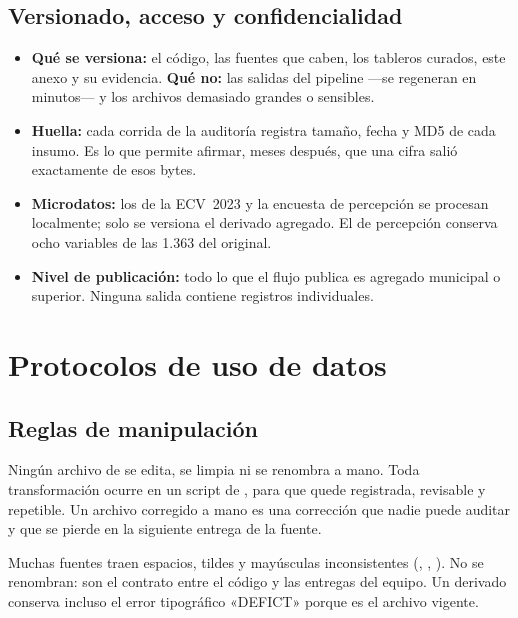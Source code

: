 \documentclass[11pt,a4paper]{article}
\begin{document}
\subsection{Versionado, acceso y confidencialidad}

\begin{itemize}[leftmargin=*, itemsep=2pt]
  \item \textbf{Qué se versiona:} el código, las fuentes que caben, los
    tableros curados, este anexo y su evidencia. \textbf{Qué no:} las salidas
    del pipeline —se regeneran en minutos— y los archivos demasiado grandes o
    sensibles.
  \item \textbf{Huella:} cada corrida de la auditoría registra tamaño, fecha y
    MD5 de cada insumo. Es lo que permite afirmar, meses después, que una cifra
    salió exactamente de esos bytes.
  \item \textbf{Microdatos:} los de la ECV~2023 y la encuesta de percepción se
    procesan localmente; solo se versiona el derivado agregado. El de percepción
    conserva ocho variables de las 1.363 del original.
  \item \textbf{Nivel de publicación:} todo lo que el flujo publica es agregado
    municipal o superior. Ninguna salida contiene registros individuales.
\end{itemize}

\section{Protocolos de uso de datos}

\subsection{Reglas de manipulación}

\begin{regla}[title={Regla 2 — las fuentes no se tocan}]
Ningún archivo de  se edita, se limpia ni se renombra a mano.
Toda transformación ocurre en un script de ,
para que quede registrada, revisable y repetible. Un archivo corregido a mano
es una corrección que nadie puede auditar y que se pierde en la siguiente
entrega de la fuente.
\end{regla}

\begin{regla}[title={Regla 3 — los nombres de archivo son un contrato}]
Muchas fuentes traen espacios, tildes y mayúsculas inconsistentes
(, ,
). No se renombran: son el contrato entre
el código y las entregas del equipo. Un derivado conserva incluso el error
tipográfico «DEFICT» porque es el archivo vigente.
\end{regla}
\end{document}
